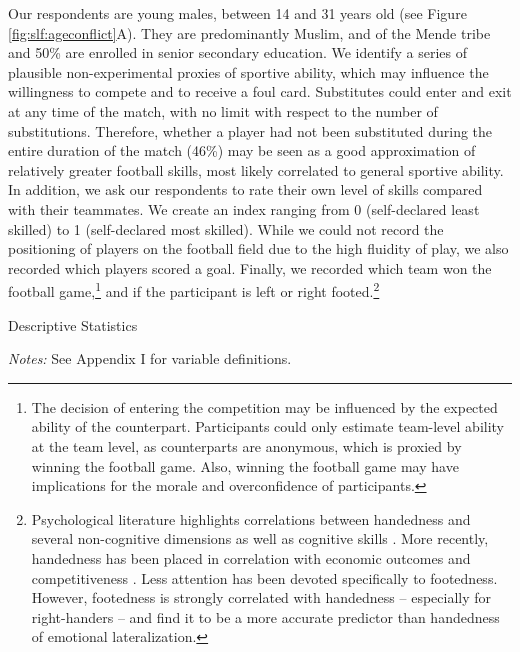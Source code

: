 Our respondents are young males, between 14 and 31 years old (see Figure \ref{fig:slf:ageconflict}A). They are predominantly Muslim, and of the Mende tribe and 50\% are enrolled in senior secondary education. We identify a series of plausible non-experimental proxies of sportive ability, which may influence the willingness to compete and to receive a foul card. Substitutes could enter and exit at any time of the match, with no limit with respect to the number of substitutions. Therefore, whether a player had not been substituted during the entire duration of the match (46\%) may be seen as a good approximation of relatively greater football skills, most likely correlated to general sportive ability. In addition, we ask our respondents to rate their own level of skills compared with their teammates. We create an index ranging from 0 (self-declared least skilled) to 1 (self-declared most skilled). While we could not record the positioning of players on the football field due to the high fluidity of play, we also recorded which players scored a goal. Finally, we recorded which team won the football game,\footnote{The decision of entering the competition may be influenced by the expected ability of the counterpart. Participants could only estimate team-level ability at the team level, as counterparts are anonymous, which is proxied by winning the football game. Also, winning the football game may have implications for the morale and overconfidence of participants.}  and if the participant is left or right footed.\footnote{Psychological literature highlights correlations between handedness and several non-cognitive dimensions \citep{Goldberg1994} as well as cognitive skills \citep{Sanders1982,Faurie2006}. More recently, handedness has been placed in correlation with economic outcomes \citep{Denny2007} and competitiveness \citep{Hoffman2010}. Less attention has been devoted specifically to footedness. However, footedness is strongly correlated with handedness – especially for right-handers \citep{Peters1979} – and \citet{Elias1998} find it to be a more accurate predictor than handedness of emotional lateralization.} 

\begin{threeparttable}[p!]
	\caption{Descriptive Statistics}
	\label{tab:slf:summstats}
	\centering
	
	\begin{tablenotes}
		\item \textit{Notes:} See Appendix I for variable definitions.
	\end{tablenotes}
\end{threeparttable}

